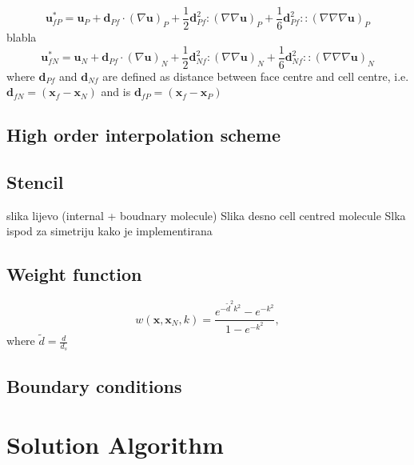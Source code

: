 \documentclass[sn-mathphys,Numbered]{sn-jnl}%
\newcommand{\bb}{\boldsymbol}
\begin{document}
\begin{equation}
\bb{u}_{fP}^* = \bb{u}_P + \bb{d}_{Pf} \cdot (\nabla \bb{u})_P + \frac{1}{2}\bb{d}_{Pf}^2 \!:\! (\nabla \nabla \bb{u})_P + \frac{1}{6}\bb{d}_{Pf}^2 \!::\! (\nabla \nabla \nabla \bb{u})_P
\end{equation}
blabla
\begin{equation}
\bb{u}_{fN}^* = \bb{u}_N + \bb{d}_{Pf} \cdot (\nabla \bb{u})_N + \frac{1}{2}\bb{d}_{Nf}^2 \!:\! (\nabla \nabla \bb{u})_N + \frac{1}{6}\bb{d}_{Nf}^2 \!::\! (\nabla \nabla \nabla \bb{u})_N
\end{equation}
where $\bb{d}_{Pf}$ and $\bb{d}_{Nf}$  are defined as distance between face centre and cell centre, i.e. $\bb{d}_{fN}=(\bb{x}_f-\bb{x}_N)$ and is $\bb{d}_{fP}=(\bb{x}_f-\bb{x}_P)$ 



%
\subsection{High order interpolation scheme}
\label{sec:ho_scheme}
%

\subsection{Stencil}
slika lijevo (internal + boudnary molecule)
Slika desno cell centred molecule
Slka ispod za simetriju kako je implementirana


\subsection{Weight function}
\begin{equation}
w(\bb{x}, \bb{x}_N, k) = \frac{e^{-\tilde{d}^2k^2}-e^{-k^2}}{1-e^{-k^2}},
\end{equation}
where $\tilde{d}=\frac{d}{d_s}$
%
\subsection{Boundary conditions}
\label{sec:bc}
%


%
%      
\section{Solution Algorithm}
\label{sec:math_model}
%
%
\end{document}
